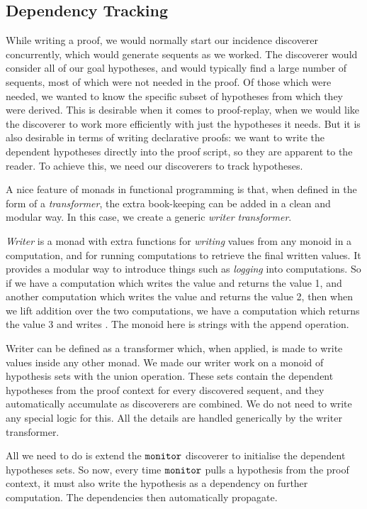 \subsection{Dependency Tracking}\label{sec:WriterMonad}
While writing a proof, we would normally start our incidence discoverer concurrently, which would generate sequents as we worked. The discoverer would consider all of our goal hypotheses, and would typically find a large number of sequents, most of which were not needed in the proof. Of those which were needed, we wanted to know the specific subset of hypotheses from which they were derived. This is desirable when it comes to proof-replay, when we would like the discoverer to work more efficiently with just the hypotheses it needs. But it is also desirable in terms of writing declarative proofs: we want to write the dependent hypotheses directly into the proof script, so they are apparent to the reader. To achieve this, we need our discoverers to track hypotheses.

A nice feature of monads in functional programming is that, when defined in the form of a \emph{transformer}, the extra book-keeping can be added in a clean and modular way. In this case, we create a generic \emph{writer transformer}.

\emph{Writer} is a monad with extra functions for \emph{writing} values from any monoid in a computation, and for running computations to retrieve the final written values. It provides a modular way to introduce things such as \emph{logging} into computations. So if we have a computation which writes the value  and returns the value 1, and another computation which writes the value  and returns the value 2, then when we lift addition over the two computations, we have a computation which returns the value 3 and writes . The monoid here is strings with the append operation.

Writer can be defined as a transformer which, when applied, is made to write values inside any other monad. We made our writer work on a monoid of hypothesis sets with the union operation. These sets contain the dependent hypotheses from the proof context for every discovered sequent, and they automatically accumulate as discoverers are combined. We do not need to write any special logic for this. All the details are handled generically by the writer transformer.

All we need to do is extend the $\texttt{monitor}$ discoverer to initialise the dependent hypotheses sets. So now, every time $\texttt{monitor}$ pulls a hypothesis from the proof context, it must also write the hypothesis as a dependency on further computation. The dependencies then automatically propagate.

